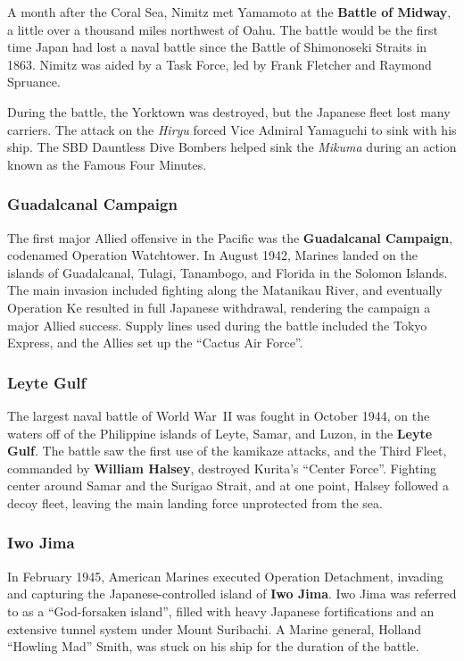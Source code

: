 A month after the Coral Sea, Nimitz met Yamamoto at the \textbf{Battle of Midway},
a little over a thousand miles northwest of Oahu.
The battle would be the first time Japan had lost a naval battle since the Battle of Shimonoseki Straits in 1863.
Nimitz was aided by a Task Force, led by Frank Fletcher and Raymond Spruance.

During the battle, the Yorktown was destroyed, but the Japanese fleet lost many carriers.
The attack on the \textit{Hiryu} forced Vice Admiral Yamaguchi to sink with his ship.
The SBD Dauntless Dive Bombers helped sink the \textit{Mikuma} during an action known as the Famous Four Minutes.

\subsubsection*{Guadalcanal Campaign}

The first major Allied offensive in the Pacific was the \textbf{Guadalcanal Campaign},
codenamed Operation Watchtower.
In August 1942, Marines landed on the islands of Guadalcanal, Tulagi, Tanambogo, and Florida in the Solomon Islands.
The main invasion included fighting along the Matanikau River,
and eventually Operation Ke resulted in full Japanese withdrawal, rendering the campaign a major Allied success.
Supply lines used during the battle included the Tokyo Express, and the Allies set up the ``Cactus Air Force''.

\subsubsection*{Leyte Gulf}

The largest naval battle of World War~II was fought in October 1944,
on the waters off of the Philippine islands of Leyte, Samar, and Luzon,
in the \textbf{Leyte Gulf}.
The battle saw the first use of the kamikaze attacks,
and the Third Fleet, commanded by \textbf{William Halsey}, destroyed Kurita's ``Center Force''.
Fighting center around Samar and the Surigao Strait,
and at one point, Halsey followed a decoy fleet, leaving the main landing force unprotected from the sea.

\subsubsection*{Iwo Jima}

In February 1945, American Marines executed Operation Detachment,
invading and capturing the Japanese-controlled island of \textbf{Iwo Jima}.
Iwo Jima was referred to as a ``God-forsaken island'',
filled with heavy Japanese fortifications and an extensive tunnel system under Mount Suribachi.
A Marine general, Holland ``Howling Mad'' Smith, was stuck on his ship for the duration of the battle.

